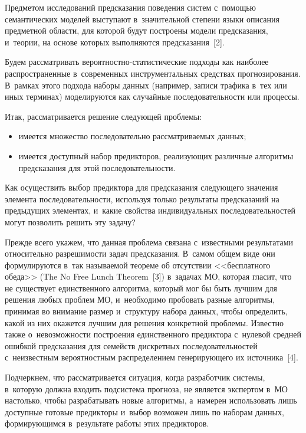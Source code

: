 \begin{multicols}{2}
  Предметом исследований предсказания поведения систем с~помощью 
семантических моделей выступают в~значительной степени языки описания 
предметной области, для которой будут построены модели предсказания, 
и~теории, на основе которых выполняются предсказания~[2]. 
  
  Будем рассматривать ве\-ро\-ят\-ност\-но-ста\-ти\-сти\-че\-ские подходы 
как наиболее распространенные в~современных инструментальных 
средствах прогнозирования. В~рамках этого подхода наборы данных 
(например, записи трафика в~тех или иных терминах) моделируются как 
случайные последовательности или процессы. 
  
  Итак, рассматривается решение следующей проблемы: 
  \begin{itemize}
  \item имеется множество последовательно рас\-смат\-ри\-ва\-емых данных; 
  \item имеется доступный набор предикторов, реализующих различные 
алгоритмы предсказания для этой последовательности.
  \end{itemize}
   
  Как осуществить выбор предиктора для предсказания следующего 
значения элемента последовательности, используя только результаты 
предсказаний на предыдущих элементах, и~какие свойства индивидуальных 
последовательностей могут позволить решить эту задачу?
  
  Прежде всего укажем, что данная проблема связана с~известными 
результатами относительно разрешимости задач предсказания. В~самом 
общем виде они формулируются в~так называемой теореме об отсутствии 
<<бесплатного обеда>> (The No Free Lunch Theorem~[3]) в~задачах МО, 
которая гласит, что не существует единственного алгоритма, который мог бы 
быть лучшим для решения любых проблем МО, и~необходимо пробовать 
разные алгоритмы, принимая во внимание размер и~структуру набора 
данных, чтобы определить, какой из них окажется лучшим для решения 
конкретной проблемы. Известно также о~невозможности построения 
единственного предиктора с~нулевой средней ошибкой предсказания для 
семейств дискретных последовательностей с~неизвестным вероятностным 
распределением генерирующего их источника~[4].
   
  Подчеркнем, что рассматривается ситуация, когда разработчик системы, 
в~которую должна входить подсистема прогноза, не является экспертом 
в~МО настолько, чтобы разрабатывать новые алгоритмы, а~намерен 
использовать лишь доступные готовые предикторы и~выбор возможен лишь 
по наборам данных, формирующимся в~результате работы этих предикторов. 
  

\end{multicols}
